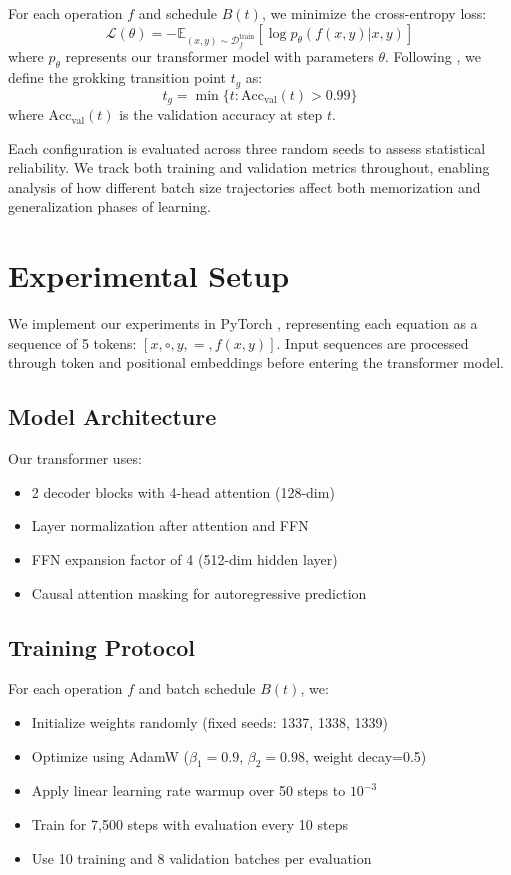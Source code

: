 \documentclass{article} %
\begin{document}
For each operation $f$ and schedule $B(t)$, we minimize the cross-entropy loss:
\begin{equation}
    \mathcal{L}(\theta) = -\mathbb{E}_{(x,y) \sim \mathcal{D}_f^{\text{train}}} [\log p_\theta(f(x,y)|x,y)]
\end{equation}
where $p_\theta$ represents our transformer model with parameters $\theta$. Following \citet{power2022grokking}, we define the grokking transition point $t_g$ as:
\begin{equation}
    t_g = \min\{t : \text{Acc}_{\text{val}}(t) > 0.99\}
\end{equation}
where $\text{Acc}_{\text{val}}(t)$ is the validation accuracy at step $t$.

Each configuration is evaluated across three random seeds to assess statistical reliability. We track both training and validation metrics throughout, enabling analysis of how different batch size trajectories affect both memorization and generalization phases of learning.

\section{Experimental Setup}
\label{sec:experimental}

We implement our experiments in PyTorch \citep{paszke2019pytorch}, representing each equation as a sequence of 5 tokens: $[x, \circ, y, =, f(x,y)]$. Input sequences are processed through token and positional embeddings before entering the transformer model.

\subsection{Model Architecture}
Our transformer uses:
\begin{itemize}
    \item 2 decoder blocks with 4-head attention (128-dim)
    \item Layer normalization after attention and FFN
    \item FFN expansion factor of 4 (512-dim hidden layer)
    \item Causal attention masking for autoregressive prediction
\end{itemize}

\subsection{Training Protocol}
For each operation $f$ and batch schedule $B(t)$, we:
\begin{itemize}
    \item Initialize weights randomly (fixed seeds: 1337, 1338, 1339)
    \item Optimize using AdamW ($\beta_1=0.9$, $\beta_2=0.98$, weight decay=0.5)
    \item Apply linear learning rate warmup over 50 steps to $10^{-3}$
    \item Train for 7,500 steps with evaluation every 10 steps
    \item Use 10 training and 8 validation batches per evaluation
\end{itemize}
\end{document}
